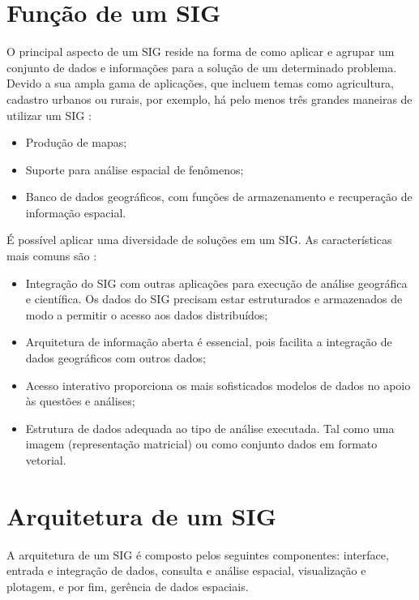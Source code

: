 \section{Função de um SIG}

O principal aspecto de um SIG reside na forma de como aplicar e agrupar um conjunto de dados e informações para a solução de um determinado problema. Devido a sua ampla gama de aplicações, que incluem temas como agricultura, cadastro urbanos ou rurais, por exemplo, há pelo menos três grandes maneiras de utilizar um SIG \cite{websisbra}:

\begin{itemize}
\item Produção de mapas;
\item Suporte para análise espacial de fenômenos;
\item Banco de dados geográficos, com funções de armazenamento e recuperação de informação espacial.
\end{itemize}

\newpage

É possível aplicar uma diversidade de soluções em um SIG. As características mais comuns são \cite{zeiler}:

\begin{itemize}
\item Integração do SIG com outras aplicações para execução de análise geográfica e científica. Os dados do SIG precisam estar estruturados e armazenados de modo a permitir o acesso aos dados distribuídos;
\item Arquitetura de informação aberta é essencial, pois facilita a integração de dados geográficos com outros dados;
\item Acesso interativo proporciona os mais sofisticados modelos de dados no apoio às questões e análises;
\item Estrutura de dados adequada ao tipo de análise executada. Tal como uma imagem (representação matricial) ou como conjunto dados em formato vetorial.
\end{itemize}

\section{Arquitetura de um SIG}

A arquitetura de um SIG é composto pelos seguintes componentes: interface, entrada e integração de dados, consulta e análise espacial, visualização e plotagem, e por fim, gerência de dados espaciais.

